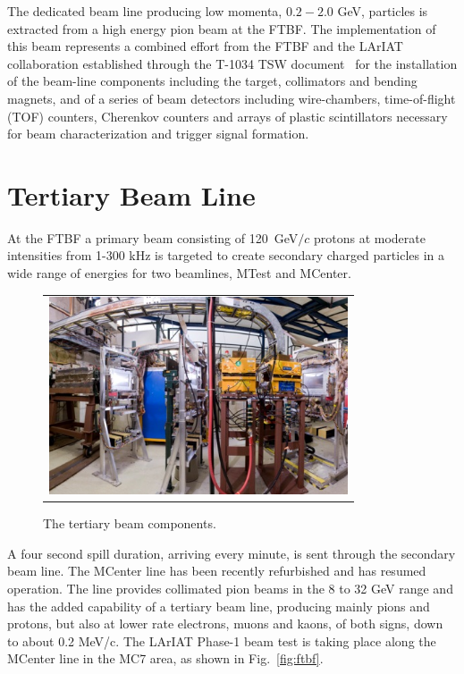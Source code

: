 \documentclass[DIV=calc, paper=a4, fontsize=10pt, twocolumn]{scrartcl}	 %
\begin{document}
{The dedicated beam line producing low momenta, $0.2 - 2.0$ GeV, particles is extracted from a high energy pion beam at the FTBF.  The implementation of this beam represents a combined effort from the FTBF and the LArIAT collaboration established  through the T-1034 TSW document~\cite{LArIAT-MoU} for the installation of the beam-line components including the target, collimators and bending magnets,  and of a series of beam detectors including wire-chambers, time-of-flight (TOF) counters, Cherenkov  counters and arrays of plastic scintillators necessary for beam characterization and trigger signal formation.

\section{Tertiary Beam Line}
\label{beam}
At the FTBF a primary beam consisting of 120~GeV$/c$ protons at moderate intensities from 1-300 kHz is targeted to create secondary charged particles in a wide range of energies for two beamlines, MTest and MCenter.
\begin{figure}[!h]
\begin{centering}
\begin{tabular}{c}
\includegraphics[height=2.3in]{Figures/tertiaryLine.jpg}
\end{tabular}
\caption{
{\scriptsize \sf The tertiary beam components.}
}
\label{fig:tertiary}
\end{centering}
\end{figure}
A four second spill duration, arriving every minute, is sent through the secondary beam line.  The MCenter line has been recently refurbished and has resumed operation. The line provides collimated pion beams in the 8 to 32 GeV range and has the added capability of a tertiary beam line, producing mainly pions and protons, but also at lower rate electrons, muons and kaons, of both signs, down to about 0.2 MeV/c. The LArIAT Phase-1 beam test is taking place along the MCenter line in the MC7 area, as shown in  Fig.~\ref{fig:ftbf}.

}
\end{document}
